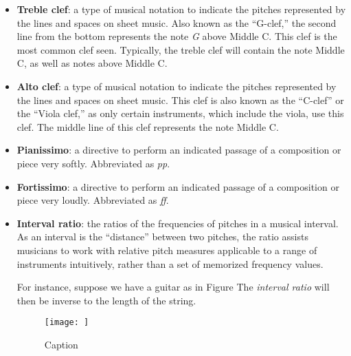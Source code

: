 \begin{itemize}
    \item {\textbf{Treble clef}: a type of musical notation to indicate the pitches represented by the lines and spaces on sheet music. Also known as the ``G-clef,'' the second line from the bottom represents the note \textit{G} above Middle C. This clef is the most common clef seen. Typically, the treble clef will contain the note Middle C, as well as notes above Middle C.}
    \item {\textbf{Alto clef}: a type of musical notation to indicate the pitches represented by the lines and spaces on sheet music. This clef is also known as the ``C-clef'' or the ``Viola clef,'' as only certain instruments, which include the viola, use this clef. The middle line of this clef represents the note Middle C.}
    \item {\textbf{Pianissimo}: a directive to perform an indicated passage of a composition or piece very softly. Abbreviated as \textit{pp}.}
    \item {\textbf{Fortissimo}: a directive to perform an indicated passage of a composition or piece very loudly. Abbreviated as \textit{ff}.}
    \item {\textbf{Interval ratio}: the ratios of the frequencies of pitches in a musical interval. As an interval is the ``distance'' between two pitches, the ratio assists musicians to work with relative pitch measures applicable to a range of instruments intuitively, rather than a set of memorized frequency values.}
    
    For instance, suppose we have a guitar as in Figure  The \textit{interval ratio} will then be inverse to the length of the string. 
    
    \begin{figure}
        \centering
        \texttt{[image: ]}
        \caption{Caption}
        \label{fig:my_label}
    \end{figure}
    
\end{itemize}
